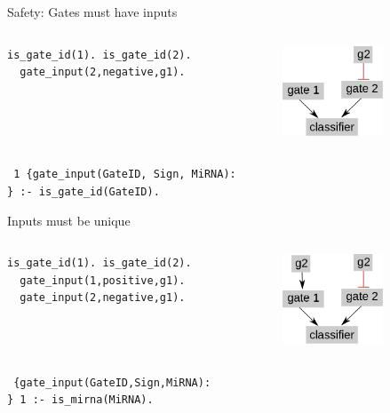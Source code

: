 \documentclass[10pt,dvipsnames]{beamer}
\begin{document}
\begin{frame}[fragile]{Safety: Gates must have inputs}
 \begin{columns}  
 \begin{column}{0.3\textwidth}
  \begin{Verbatim}[fontsize=\small]
  is_gate_id(1). is_gate_id(2).
  gate_input(2,negative,g1).
 \end{Verbatim}
 \end{column}
 \begin{column}{0.5\textwidth}
 \begin{center}\includegraphics[width=3cm]{constraints_01.png}\end{center}
 \end{column}
 \end{columns}
 \vspace{2cm}
 \texttt{
 1 \{gate\_input(GateID, Sign, MiRNA):\\
  \} :- is\_gate\_id(GateID).
 }
 
\end{frame}

\begin{frame}[fragile]{Inputs must be unique}
 \begin{columns}  
 \begin{column}{0.3\textwidth}
  \begin{Verbatim}[fontsize=\small]
  is_gate_id(1). is_gate_id(2).
  gate_input(1,positive,g1).
  gate_input(2,negative,g1).
 \end{Verbatim}
 \end{column}
 \begin{column}{0.5\textwidth}
 \begin{center}\includegraphics[width=3cm]{constraints_02.png}\end{center}
 \end{column}
 \end{columns}
 \vspace{2cm}
 \texttt{
  \{gate\_input(GateID,Sign,MiRNA):\\
   \} 1 :- is\_mirna(MiRNA).
 }
 
\end{frame}
\end{document}
